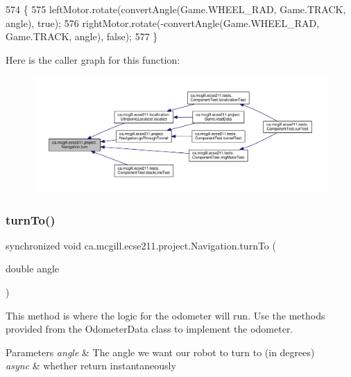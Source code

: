 \begin{DoxyCode}
574                               \{
575     leftMotor.rotate(convertAngle(Game.WHEEL\_RAD, Game.TRACK, angle), \textcolor{keyword}{true});
576     rightMotor.rotate(-convertAngle(Game.WHEEL\_RAD, Game.TRACK, angle), \textcolor{keyword}{false});
577   \}
\end{DoxyCode}
Here is the caller graph for this function\+:\nopagebreak
\begin{figure}[H]
\begin{center}
\leavevmode
\includegraphics[width=350pt]{classca_1_1mcgill_1_1ecse211_1_1project_1_1_navigation_ad74286ad36d333bfaf57661837457b76_icgraph}
\end{center}
\end{figure}
\mbox{\label{classca_1_1mcgill_1_1ecse211_1_1project_1_1_navigation_a3bbe0645f2b3b3d0986b4a707fb5a00c}} 
\subsubsection{\texorpdfstring{turn\+To()}{turnTo()}}
{\footnotesize\ttfamily synchronized void ca.\+mcgill.\+ecse211.\+project.\+Navigation.\+turn\+To (\begin{DoxyParamCaption}\item[{double}]{angle }\end{DoxyParamCaption})}

This method is where the logic for the odometer will run. Use the methods provided from the Odometer\+Data class to implement the odometer.


\begin{DoxyParams}{Parameters}
{\em angle} & The angle we want our robot to turn to (in degrees) \\
\hline
{\em async} & whether return instantaneously \\
\hline
\end{DoxyParams}


